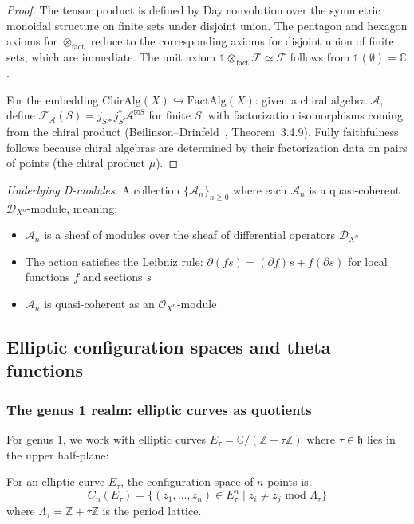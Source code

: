 \begin{proof}
The tensor product is defined by Day convolution over the symmetric monoidal structure on finite sets under disjoint union.  The pentagon and hexagon axioms for $\otimes_{\mathrm{fact}}$ reduce to the corresponding axioms for disjoint union of finite sets, which are immediate.  The unit axiom $\mathbb{1} \otimes_{\mathrm{fact}} \mathcal{F} \simeq \mathcal{F}$ follows from $\mathbb{1}(\emptyset) = \mathbb{C}$.

For the embedding $\mathrm{ChirAlg}(X) \hookrightarrow \mathrm{FactAlg}(X)$: given a chiral algebra $\mathcal{A}$, define $\mathcal{F}_{\mathcal{A}}(S) = j_{S*}j_S^*\mathcal{A}^{\boxtimes S}$ for finite $S$, with factorization isomorphisms coming from the chiral product (Beilinson--Drinfeld~\cite{BD04}, Theorem~3.4.9).  Fully faithfulness follows because chiral algebras are determined by their factorization data on pairs of points (the chiral product $\mu$).
\end{proof}

\emph{Underlying D-modules.} A collection $\{\mathcal{A}_n\}_{n \geq 0}$ where each $\mathcal{A}_n$ is a quasi-coherent $\mathcal{D}_{X^n}$-module, meaning:
\begin{itemize}
\item $\mathcal{A}_n$ is a sheaf of modules over the sheaf of differential operators $\mathcal{D}_{X^n}$
\item The action satisfies the Leibniz rule: $\partial(fs) = (\partial f)s + f(\partial s)$ for local functions $f$ and sections $s$
\item $\mathcal{A}_n$ is quasi-coherent as an $\mathcal{O}_{X^n}$-module
\end{itemize}

\subsection{Elliptic configuration spaces and theta functions}

\subsubsection{The genus 1 realm: elliptic curves as quotients}

For genus 1, we work with elliptic curves $E_\tau = \mathbb{C}/(\mathbb{Z} + \tau\mathbb{Z})$ where $\tau \in \mathfrak{h}$ lies in the upper half-plane:

\begin{definition}
For an elliptic curve $E_\tau$, the configuration space of $n$ points is:
\[
C_n(E_\tau) = \{(z_1, \ldots, z_n) \in E_\tau^n \mid z_i \neq z_j \text{ mod } \Lambda_\tau\}
\]
where $\Lambda_\tau = \mathbb{Z} + \tau\mathbb{Z}$ is the period lattice.
\end{definition}

